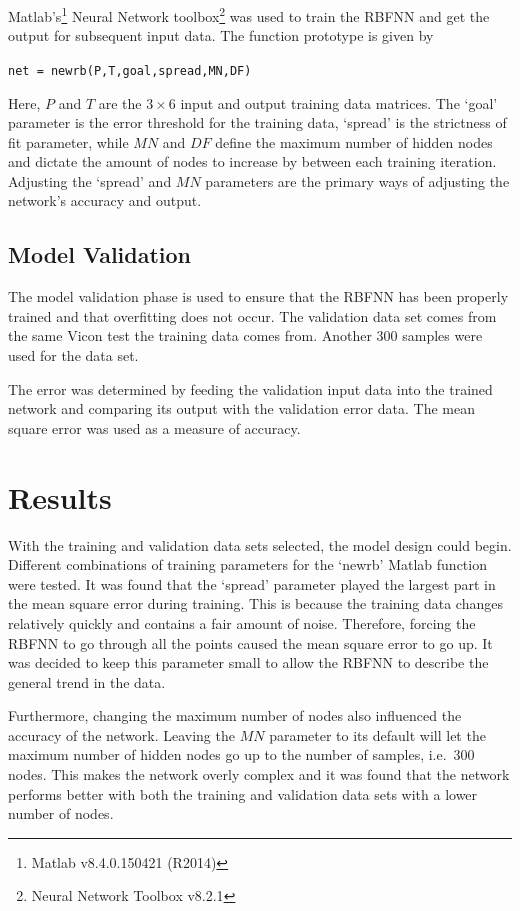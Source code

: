 Matlab's\footnote{Matlab v8.4.0.150421 (R2014)} Neural Network toolbox\footnote{Neural Network Toolbox v8.2.1} was used to train the RBFNN and get the output for subsequent input data. The function prototype is given by 

\begin{center}
  \verb|net = newrb(P,T,goal,spread,MN,DF)|
\end{center}

Here, $P$ and $T$ are the $3\times6$ input and output training data matrices. The `goal' parameter is the error threshold for the training data, `spread' is the strictness of fit parameter, while $MN$ and $DF$ define the maximum number of hidden nodes and dictate the amount of nodes to increase by between each training iteration. Adjusting the `spread' and $MN$ parameters are the primary ways of adjusting the network's accuracy and output. 

\subsection{Model Validation}

The model validation phase is used to ensure that the RBFNN has been properly trained and that overfitting does not occur. The validation data set comes from the same Vicon test the training data comes from. Another 300 samples were used for the data set. 

The error was determined by feeding the validation input data into the trained network and comparing its output with the validation error data. The mean square error was used as a measure of accuracy. 

\section{Results}

With the training and validation data sets selected, the model design could begin. Different combinations of training parameters for the `newrb' Matlab function were tested. It was found that the `spread' parameter played the largest part in the mean square error during training. This is because the training data changes relatively quickly and contains a fair amount of noise. Therefore, forcing the RBFNN to go through all the points caused the mean square error to go up. It was decided to keep this parameter small to allow the RBFNN to describe the general trend in the data. 

Furthermore, changing the maximum number of nodes also influenced the accuracy of the network. Leaving the $MN$ parameter to its default will let the maximum number of hidden nodes go up to the number of samples, i.e.\ 300 nodes. This makes the network overly complex and it was found that the network performs better with both the training and validation data sets with a lower number of nodes. 

